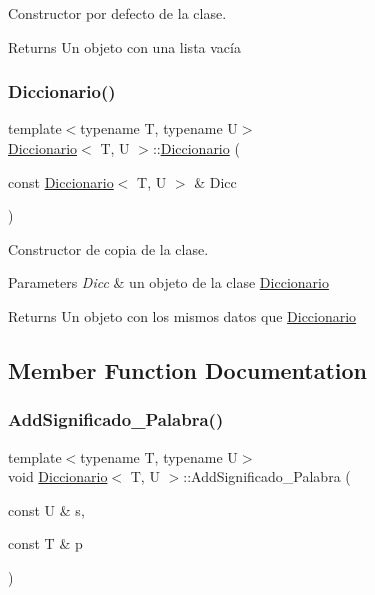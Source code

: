 Constructor por defecto de la clase. 

\begin{DoxyReturn}{Returns}
Un objeto con una lista vacía 
\end{DoxyReturn}
\mbox{\label{classDiccionario_aec12a6b43434389d8e244bb85db29149}} 
\subsubsection{\texorpdfstring{Diccionario()}{Diccionario()}\hspace{0.1cm}{\footnotesize\ttfamily [2/2]}}
{\footnotesize\ttfamily template$<$typename T, typename U$>$ \\
\hyperlink{classDiccionario}{Diccionario}$<$ T, U $>$\+::\hyperlink{classDiccionario}{Diccionario} (\begin{DoxyParamCaption}\item[{const \hyperlink{classDiccionario}{Diccionario}$<$ T, U $>$ \&}]{Dicc }\end{DoxyParamCaption})\hspace{0.3cm}{\ttfamily [inline]}}



Constructor de copia de la clase. 


\begin{DoxyParams}{Parameters}
{\em Dicc} & un objeto de la clase \hyperlink{classDiccionario}{Diccionario} \\
\hline
\end{DoxyParams}
\begin{DoxyReturn}{Returns}
Un objeto con los mismos datos que \hyperlink{classDiccionario}{Diccionario} 
\end{DoxyReturn}


\subsection{Member Function Documentation}
\mbox{\label{classDiccionario_a7e167da231bff610001df3c20cc9b7a7}} 
\subsubsection{\texorpdfstring{Add\+Significado\+\_\+\+Palabra()}{AddSignificado\_Palabra()}}
{\footnotesize\ttfamily template$<$typename T, typename U$>$ \\
void \hyperlink{classDiccionario}{Diccionario}$<$ T, U $>$\+::Add\+Significado\+\_\+\+Palabra (\begin{DoxyParamCaption}\item[{const U \&}]{s,  }\item[{const T \&}]{p }\end{DoxyParamCaption})}



